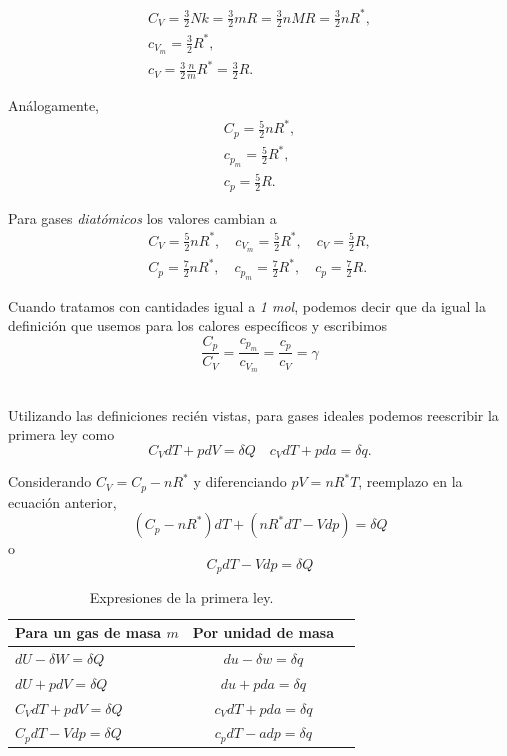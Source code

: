 \documentclass[openany]{book}
\begin{document}
\begin{gather*}
	C_V=\frac{3}{2}Nk=\frac{3}{2}mR=\frac{3}{2}nMR=\frac{3}{2}nR^*,\\
	c_{V_m}=\frac{3}{2}R^*,\\
	c_V=\frac{3}{2}\frac{n}{m}R^*=\frac{3}{2}R.
\end{gather*}
\par Análogamente,
\begin{gather*}
	C_p=\frac{5}{2}nR^*,\\
	c_{p_m}=\frac{5}{2}R^*,\\
	c_p=\frac{5}{2}R.
\end{gather*}
\par Para gases \emph{diatómicos} los valores cambian a
\begin{gather*}
	C_V=\frac{5}{2}nR^*,\quad c_{V_m}=\frac{5}{2}R^*,\quad c_V=\frac{5}{2}R,\\
	C_p=\frac{7}{2}nR^*,\quad c_{p_m}=\frac{7}{2}R^*,\quad c_p=\frac{7}{2}R.
\end{gather*}
\par Cuando tratamos con cantidades igual a \emph{1 mol}, podemos decir que da igual la definición que usemos para los calores específicos y escribimos
\begin{equation*}
	\frac{C_p}{C_V}=\frac{c_{p_m}}{c_{V_m}}=\frac{c_p}{c_V}=\gamma
\end{equation*}
\\
\par Utilizando las definiciones recién vistas, para gases ideales podemos reescribir la primera ley como
\begin{equation}\label{eq:1leycv}
	C_VdT+pdV=\delta Q\quad c_VdT+pda=\delta q.
\end{equation}
\par Considerando $C_V=C_p-nR^*$ y diferenciando $pV=nR^*T$, reemplazo en la ecuación anterior,
\begin{equation*}
	(C_p-nR^*)dT+(nR^*dT-Vdp)=\delta Q
\end{equation*}
o
\begin{equation}\label{eq:1leycp}
	C_pdT-Vdp=\delta Q
\end{equation}

\begin{table}[!hbt]
	\centering
	\caption{Expresiones de la primera ley.}
	\label{tab:primeraley}
	\begin{tabular}{|l|c|c|}
		\hline Para un gas de masa $m$         & Por unidad de masa                     \\
		\hline $dU-\delta W=\delta Q$          & $ du-\delta w=\delta q $               \\
		$ dU+pdV=\delta Q $                    & $ du+pda=\delta q $                    \\
		$ C_VdT+pdV=\delta Q $\footnotemark[1] & $ c_VdT+pda=\delta q $\footnotemark[1] \\
		$ C_pdT-Vdp=\delta Q $\footnotemark[1] & $ c_pdT-adp=\delta q $\footnotemark[1] \\
		\hline
	\end{tabular}
\end{table}
\end{document}
